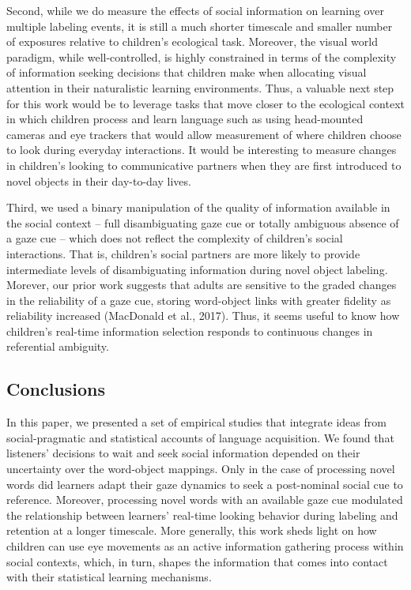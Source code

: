 \documentclass[man,floatsintext]{apa6}
\begin{document}
Second, while we do measure the effects of social information on
learning over multiple labeling events, it is still a much shorter
timescale and smaller number of exposures relative to children's
ecological task. Moreover, the visual world paradigm, while
well-controlled, is highly constrained in terms of the complexity of
information seeking decisions that children make when allocating visual
attention in their naturalistic learning environments. Thus, a valuable
next step for this work would be to leverage tasks that move closer to
the ecological context in which children process and learn language such
as using head-mounted cameras and eye trackers that would allow
measurement of where children choose to look during everyday
interactions. It would be interesting to measure changes in children's
looking to communicative partners when they are first introduced to
novel objects in their day-to-day lives.

Third, we used a binary manipulation of the quality of information
available in the social context -- full disambiguating gaze cue or
totally ambiguous absence of a gaze cue -- which does not reflect the
complexity of children's social interactions. That is, children's social
partners are more likely to provide intermediate levels of
disambiguating information during novel object labeling. Morever, our
prior work suggests that adults are sensitive to the graded changes in
the reliability of a gaze cue, storing word-object links with greater
fidelity as reliability increased (MacDonald et al., 2017). Thus, it
seems useful to know how children's real-time information selection
responds to continuous changes in referential ambiguity.

\subsection{Conclusions}\label{conclusions}

In this paper, we presented a set of empirical studies that integrate
ideas from social-pragmatic and statistical accounts of language
acquisition. We found that listeners' decisions to wait and seek social
information depended on their uncertainty over the word-object mappings.
Only in the case of processing novel words did learners adapt their gaze
dynamics to seek a post-nominal social cue to reference. Moreover,
processing novel words with an available gaze cue modulated the
relationship between learners' real-time looking behavior during
labeling and retention at a longer timescale. More generally, this work
sheds light on how children can use eye movements as an active
information gathering process within social contexts, which, in turn,
shapes the information that comes into contact with their statistical
learning mechanisms.
\end{document}
